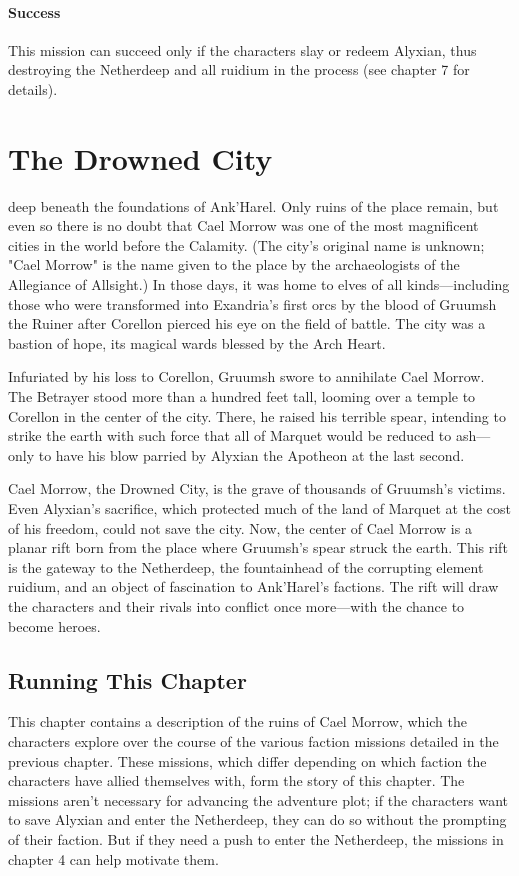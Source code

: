 \documentclass[10pt,a4paper,twoside,bg=print,twocolumn,openany,nodeprecatedcode]{dndbook}
\begin{document}
\subsubsection{Success}
This mission can succeed only if the characters slay or redeem Alyxian, thus destroying the Netherdeep and all ruidium in the process (see chapter 7 for details).

\chapter{The Drowned City}
 deep beneath the foundations of Ank'Harel. Only ruins of the place remain, but even so there is no doubt that Cael Morrow was one of the most magnificent cities in the world before the Calamity. (The city's original name is unknown; "Cael Morrow" is the name given to the place by the archaeologists of the Allegiance of Allsight.) In those days, it was home to elves of all kinds—including those who were transformed into Exandria's first orcs by the blood of Gruumsh the Ruiner after Corellon pierced his eye on the field of battle. The city was a bastion of hope, its magical wards blessed by the Arch Heart.


Infuriated by his loss to Corellon, Gruumsh swore to annihilate Cael Morrow. The Betrayer stood more than a hundred feet tall, looming over a temple to Corellon in the center of the city. There, he raised his terrible spear, intending to strike the earth with such force that all of Marquet would be reduced to ash—only to have his blow parried by Alyxian the Apotheon at the last second.

Cael Morrow, the Drowned City, is the grave of thousands of Gruumsh's victims. Even Alyxian's sacrifice, which protected much of the land of Marquet at the cost of his freedom, could not save the city. Now, the center of Cael Morrow is a planar rift born from the place where Gruumsh's spear struck the earth. This rift is the gateway to the Netherdeep, the fountainhead of the corrupting element ruidium, and an object of fascination to Ank'Harel's factions. The rift will draw the characters and their rivals into conflict once more—with the chance to become heroes.

\section{Running This Chapter}
This chapter contains a description of the ruins of Cael Morrow, which the characters explore over the course of the various faction missions detailed in the previous chapter. These missions, which differ depending on which faction the characters have allied themselves with, form the story of this chapter. The missions aren't necessary for advancing the adventure plot; if the characters want to save Alyxian and enter the Netherdeep, they can do so without the prompting of their faction. But if they need a push to enter the Netherdeep, the missions in chapter 4 can help motivate them.
\end{document}
